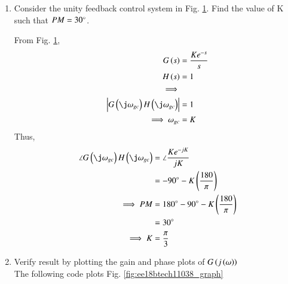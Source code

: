 \begin{enumerate}[label=\thesubsection.\arabic*.,ref=\thesubsection.\theenumi]

\item
Consider the unity feedback control system in Fig.  \ref{fig:ee18btech11038}. Find the value of K such that $PM = 30\degree$.

\begin{figure}[!ht]
	\begin{center}
		
		\resizebox{\columnwidth}{!}{}
	\end{center}
\caption{}
\label{fig:ee18btech11038}
\end{figure}
\solution From Fig. \ref{fig:ee18btech11038},
%
\begin{align}
G\brak{s} &= \frac{Ke^{-s}}{s}
\\
H\brak{s} &= 1
\\
\implies 
%
\\
\abs{G\brak{\j\omega_{gc}}H\brak{\j\omega_{gc}}} &= 1
\\
\implies \omega_{gc} &= K  
\end{align}
%
Thus, 
\begin{align}
\label{eq:PM_in_K}
\angle G\brak{\j\omega_{gc}}H\brak{\j\omega_{gc}} &=
 \angle \frac{{Ke^{-jK}}}{jK} 
\\
&= -90\degree - K\brak{\frac{180}{\pi}}
\\
\implies
    PM &= 180\degree -90\degree - K\brak{\frac{180}{\pi}}
\\
 &= 30\degree
    \\
\implies    K&= \frac{\pi}{3}
\end{align}
\item Verify result by plotting the gain and phase plots of $G\left(j\left(\omega\right)\right)$ 
\\
\solution The following code plots Fig. \ref{fig:ee18btech11038_graph}


\end{enumerate}
